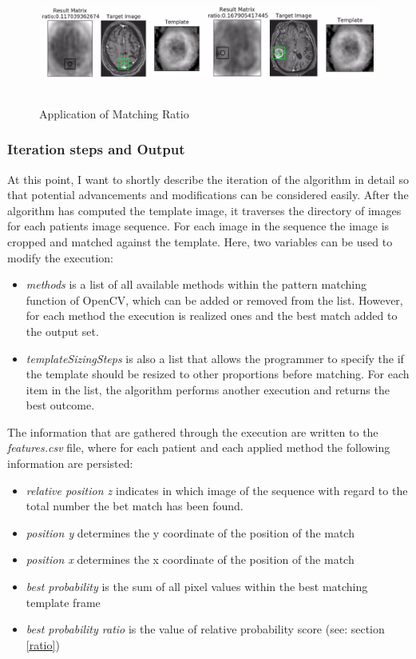 \documentclass[twoside,11pt]{article}
\begin{document}
	\begin{figure}
		\label{fig:ratio}
		\centering
		\includegraphics[height=4cm]{ratio}
		\caption{Application of Matching Ratio}
	\end{figure}%
	
	\subsubsection{Iteration steps and Output}
	At this point, I want to shortly describe the iteration of the algorithm in detail so that potential advancements and modifications can be considered easily. After the algorithm has computed the template image, it traverses the directory of images for each patients image sequence. For each image in the sequence the image is cropped and matched against the template. Here, two variables can be used to modify the execution:
	\begin{itemize}
		\item \textit{methods} is a list of all available methods within the pattern matching function of OpenCV, which can be added or removed from the list. However, for each method the execution is realized ones and the best match added to the output set.
		\item \textit{templateSizingSteps} is also a list that allows the programmer to specify the if the template should be resized to other proportions before matching. For each item in the list, the algorithm performs another execution and returns the best outcome.
	\end{itemize}
	
	The information that are gathered through the execution are written to the \textit{features.csv} file, where for each patient and each applied method the following information are persisted:
	
	\begin{itemize}
		\item \textit{relative position z} indicates in which image of the sequence with regard to the total number the bet match has been found.
		\item \textit{position y} determines the y coordinate of the position of the match
		\item \textit{position x} determines the x coordinate of the position of the match
		\item \textit{best probability} is the sum of all pixel values within the best matching template frame
		\item \textit{best probability ratio} is the value of relative probability score (see: section \ref{ratio}) 
	\end{itemize}
	
\end{document}
